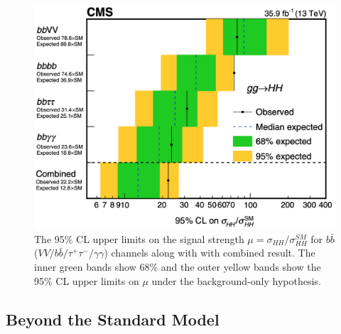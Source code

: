 \begin{figure}[ht]
	\centering
	\includegraphics[scale=0.4]{MSc_Thesis/fig/HHupperlimit.png}
	\vspace{2mm}
	\caption[The 95\% CL upper limits on the signal strength $\mu = \sigma_{HH} / \sigma_{HH}^{SM}$ for $b\bar b$($VV/b\bar b/\tau^+\tau^-/\gamma\gamma$) channels along with with combined result. The inner green bands show 68\% and the outer yellow bands show the 95\% CL upper limits on $\mu$ under the background-only hypothesis.]
	{The 95\% CL upper limits on the signal strength $\mu = \sigma_{HH} / \sigma_{HH}^{SM}$ for $b\bar b$($VV/b\bar b/\tau^+\tau^-/\gamma\gamma$) channels along with with combined result. The inner green bands show 68\% and the outer yellow bands show the 95\% CL upper limits on $\mu$ under the background-only hypothesis\cite{Sirunyan2019}.}
	\label{HHupperlimit}
\end{figure}




\subsection{Beyond the Standard Model}

